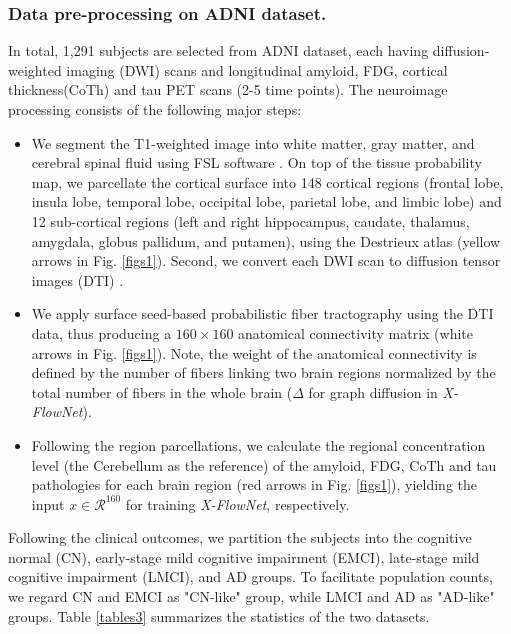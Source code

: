\documentclass{article}
\begin{document}
\subsubsection{Data pre-processing on ADNI dataset.}
\label{datapre}
In total, 1,291 subjects are selected from ADNI \cite{ADNI} dataset, each having diffusion-weighted imaging (DWI) scans and longitudinal amyloid, FDG, cortical thickness(CoTh) and tau PET scans (2-5 time points). The neuroimage processing consists of the following major steps:
\begin{itemize}
    \item We segment the T1-weighted image into white matter, gray matter, and cerebral spinal fluid using FSL software \cite{FSL}. On top of the tissue probability map, we  parcellate the cortical surface into 148 cortical regions (frontal lobe, insula lobe, temporal lobe, occipital lobe, parietal lobe, and limbic lobe) and 12 sub-cortical regions (left and right hippocampus, caudate, thalamus, amygdala, globus pallidum, and putamen), using the Destrieux atlas \cite{destrieux2010automatic} (yellow arrows in Fig. \ref{figs1}). Second, we convert each DWI scan to diffusion tensor images (DTI) \cite{DTI}.
    \item We apply surface seed-based probabilistic fiber tractography \cite{tractography} using the DTI data, thus producing a $160\times 160$ anatomical connectivity matrix (white arrows in Fig. \ref{figs1}). Note, the weight of the anatomical connectivity is defined by the number of fibers linking two brain regions normalized by the total number of fibers in the whole brain ($\Delta$ for graph diffusion in \textit{X-FlowNet}).
    \item Following the region parcellations, we calculate the regional concentration level (the Cerebellum as the reference) of the amyloid, FDG, CoTh and tau pathologies for each brain region (red arrows in Fig. \ref{figs1}), yielding the input $x\in {\mathcal{R}^{160}}$ for training \textit{X-FlowNet}, respectively.
\end{itemize}
 Following the clinical outcomes, we partition the subjects into the cognitive normal (CN), early-stage mild cognitive impairment (EMCI), late-stage mild cognitive impairment (LMCI), and AD groups. To facilitate population counts, we regard CN and EMCI as "CN-like" group, while LMCI and AD as "AD-like" groups. Table \ref{tables3} summarizes the statistics of the two datasets.
\end{document}
